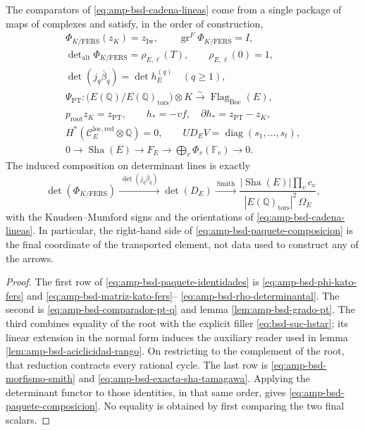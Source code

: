 \begin{proposition}
\label{prop:amp-bsd-paquete-comparadores-exacto}
The comparators of
\eqref{eq:amp-bsd-cadena-lineas} come from a single package of maps of
complexes and satisfy, in the order of construction,
\begin{equation}\label{eq:amp-bsd-paquete-identidades}
 \begin{gathered}
 \Phi_{K/\mathrm{FERS}}(z_K)=z_{\mathrm{Iw}},\qquad
 \operatorname{gr}^{F}\Phi_{K/\mathrm{FERS}}=I,\\
 \det\nolimits_{\mathrm{alt}}\Phi_{K/\mathrm{FERS}}
   =\rho_{E,\ell}(T),\qquad \rho_{E,\ell}(0)=1,\\
 \det(j_q\bar\beta_q)=\det h_E^{(q)}\quad(q\geq1),\\
 \Psi_{\mathrm{PT}}:
  \bigl(E(\mathbb Q)/E(\mathbb Q)_{\mathrm{tors}}\bigr)\otimes K
  \xrightarrow{\sim}\operatorname{Flag}_{\mathrm{Boc}}(E),\\
 p_{\mathrm{root}}z_K=z_{\mathrm{PT}},\qquad
 h_*=-vf,\quad \partial h_*=z_{\mathrm{PT}}-z_K,\\
 H^*(\mathcal C_E^{\mathrm{loc,red}}\otimes\mathbb Q)=0,\qquad
 U D_E V=\operatorname{diag}(s_1,\ldots,s_t),\\
 0\longrightarrow\operatorname{Sha}(E)
  \longrightarrow F_E
  \longrightarrow\displaystyle\bigoplus_v\Phi_v(\mathbb F_v)
  \longrightarrow0 .
 \end{gathered}
\end{equation}
The induced composition on determinant lines is exactly
\begin{equation}\label{eq:amp-bsd-paquete-composicion}
 \det(\Phi_{K/\mathrm{FERS}})
 \xrightarrow{\ \det(j_q\bar\beta_q)\ }
 \det(D_E)
 \xrightarrow{\ \mathrm{Smith}\ }
 \frac{|\operatorname{Sha}(E)|\prod_vc_v}
      {|E(\mathbb Q)_{\mathrm{tors}}|^2\,\Omega_E},
\end{equation}
with the Knudsen--Mumford signs and the orientations of
\eqref{eq:amp-bsd-cadena-lineas}. In particular, the right-hand side of
\eqref{eq:amp-bsd-paquete-composicion} is the final coordinate of the transported
element, not data used to construct any of the arrows.
\end{proposition}

\begin{proof}
The first row of \eqref{eq:amp-bsd-paquete-identidades} is
\eqref{eq:amp-bsd-phi-kato-fers} and
\eqref{eq:amp-bsd-matriz-kato-fers}--
\eqref{eq:amp-bsd-rho-determinantal}. The second is
\eqref{eq:amp-bsd-comparador-pt-q} and lemma
\ref{lem:amp-bsd-grado-pt}. The third combines equality of the root with
the explicit filler \eqref{eq:bsd-suc-hstar}; its linear extension in the
normal form induces the auxiliary reader used in lemma
\ref{lem:amp-bsd-aciclicidad-rango}. On restricting to the complement of the
root, that reduction contracts every rational cycle. The last row is
\eqref{eq:amp-bsd-morfismo-smith} and
\eqref{eq:amp-bsd-exacta-sha-tamagawa}. Applying the determinant functor to
those identities, in that same order, gives
\eqref{eq:amp-bsd-paquete-composicion}. No equality is obtained
by first comparing the two final scalars.
\end{proof}

